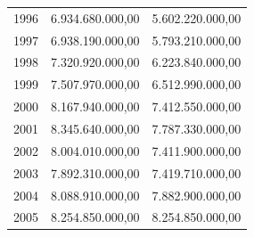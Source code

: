 \documentclass[a4paper,openright,12pt]{book}
\begin{document}
\begin{table}[]
\begin{tabular}{@{}lrr@{}}
1996 & 6.934.680.000,00                                                                                                      & 5.602.220.000,00                                                                                                      \\
1997 & 6.938.190.000,00                                                                                                      & 5.793.210.000,00                                                                                                      \\
1998 & 7.320.920.000,00                                                                                                      & 6.223.840.000,00                                                                                                      \\
1999 & 7.507.970.000,00                                                                                                      & 6.512.990.000,00                                                                                                      \\
2000 & 8.167.940.000,00                                                                                                      & 7.412.550.000,00                                                                                                      \\
2001 & 8.345.640.000,00                                                                                                      & 7.787.330.000,00                                                                                                      \\
2002 & 8.004.010.000,00                                                                                                      & 7.411.900.000,00                                                                                                      \\
2003 & 7.892.310.000,00                                                                                                      & 7.419.710.000,00                                                                                                      \\
2004 & 8.088.910.000,00                                                                                                      & 7.882.900.000,00                                                                                                      \\
2005 & 8.254.850.000,00                                                                                                      & 8.254.850.000,00                                                                                                      \\

\end{tabular}
\end{table}
\end{document}
